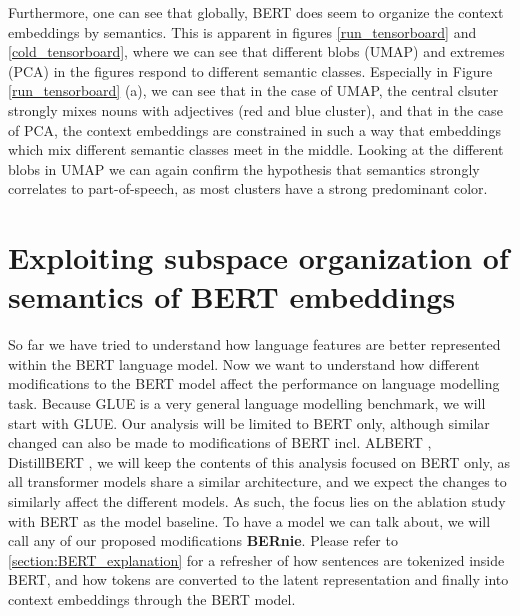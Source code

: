 \documentclass[a4paper,12pt,twoside,openright]{report}
\begin{document}
Furthermore, one can see that globally, BERT does seem to organize the context embeddings by semantics. 
This is apparent in figures \eqref{run_tensorboard} and \eqref{cold_tensorboard}, where we can see that different blobs (UMAP) and extremes (PCA) in the figures respond to different semantic classes.
Especially in Figure \eqref{run_tensorboard} (a), we can see that in the case of UMAP, the central clsuter strongly mixes nouns with adjectives (red and blue cluster), and that in the case of PCA, the context embeddings are constrained in such a way that embeddings which mix different semantic classes meet in the middle.
Looking at the different blobs in UMAP we can again confirm the hypothesis that semantics strongly correlates to part-of-speech, as most clusters have a strong predominant color.


















\chapter{Exploiting subspace organization of semantics of BERT embeddings}\label{section:ExploitingBERT}


So far we have tried to understand how language features are better represented within the BERT language model.
Now we want to understand how different modifications to the BERT model affect the performance on language modelling task.
Because GLUE is a very general language modelling benchmark, we will start with GLUE.
Our analysis will be limited to BERT only, although similar changed can also be made to modifications of BERT incl. ALBERT \cite{lan20}, DistillBERT \cite{sanh19}, we will keep the contents of this analysis focused on BERT only, as all transformer models share a similar architecture, and we expect the changes to similarly affect the different models.
As such, the focus lies on the ablation study with BERT as the model baseline.
To have a model we can talk about, we will call any of our proposed modifications \textbf{BERnie}. 
Please refer to \eqref{section:BERT_explanation} for a refresher of how sentences are tokenized inside BERT, and how tokens are converted to the latent representation and finally into context embeddings through the BERT model.
\\
\end{document}
